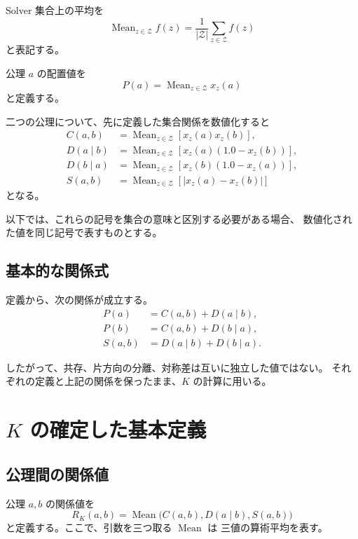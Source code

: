 \documentclass[a4paper,11pt]{ltjsarticle}
\begin{document}
Solver 集合上の平均を
\begin{equation}
  \operatorname{Mean}_{z\in\mathcal{Z}} f(z)
  =
  \frac{1}{|\mathcal{Z}|}
  \sum_{z\in\mathcal{Z}}f(z)
\end{equation}
と表記する。

公理 $a$ の配置値を
\begin{equation}
  P(a)
  =
  \operatorname{Mean}_{z\in\mathcal{Z}}x_z(a)
\end{equation}
と定義する。

二つの公理について、先に定義した集合関係を数値化すると
\begin{align}
  C(a,b)
  &=
  \operatorname{Mean}_{z\in\mathcal{Z}}
  [x_z(a)x_z(b)],\\
  D(a\mid b)
  &=
  \operatorname{Mean}_{z\in\mathcal{Z}}
  [x_z(a)(1.0-x_z(b))],\\
  D(b\mid a)
  &=
  \operatorname{Mean}_{z\in\mathcal{Z}}
  [x_z(b)(1.0-x_z(a))],\\
  S(a,b)
  &=
  \operatorname{Mean}_{z\in\mathcal{Z}}
  [|x_z(a)-x_z(b)|]
\end{align}
となる。

以下では、これらの記号を集合の意味と区別する必要がある場合、
数値化された値を同じ記号で表すものとする。

\subsection{基本的な関係式}

定義から、次の関係が成立する。
\begin{align}
  P(a)&=C(a,b)+D(a\mid b),\\
  P(b)&=C(a,b)+D(b\mid a),\\
  S(a,b)&=D(a\mid b)+D(b\mid a).
\end{align}

したがって、共存、片方向の分離、対称差は互いに独立した値ではない。
それぞれの定義と上記の関係を保ったまま、$K$ の計算に用いる。

\section{$K$ の確定した基本定義}

\subsection{公理間の関係値}

公理 $a,b$ の関係値を
\begin{equation}
  R_K(a,b)
  =
  \operatorname{Mean}
  \bigl(C(a,b),D(a\mid b),S(a,b)\bigr)
\end{equation}
と定義する。ここで、引数を三つ取る $\operatorname{Mean}$ は
三値の算術平均を表す。
\end{document}
